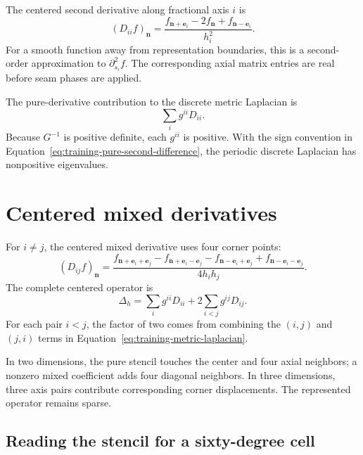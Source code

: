 The centered second derivative along fractional axis $i$ is
\begin{equation}
  (D_{ii}f)_{\mathbf n}
  =
  \frac{
    f_{\mathbf n+\mathbf e_i}
    -2f_{\mathbf n}
    +f_{\mathbf n-\mathbf e_i}}
  {h_i^2}.
  \label{eq:training-pure-second-difference}
\end{equation}
For a smooth function away from representation boundaries, this is a
second-order approximation to $\partial_{s_i}^2f$. The corresponding axial
matrix entries are real before seam phases are applied.

The pure-derivative contribution to the discrete metric Laplacian is
\begin{equation}
  \sum_i g^{ii}D_{ii}.
  \label{eq:training-pure-metric-stencil}
\end{equation}
Because $G^{-1}$ is positive definite, each $g^{ii}$ is positive. With the
sign convention in Equation~\eqref{eq:training-pure-second-difference}, the
periodic discrete Laplacian has nonpositive eigenvalues.

\section{Centered mixed derivatives}

For $i\neq j$, the centered mixed derivative uses four corner points:
\begin{equation}
  (D_{ij}f)_{\mathbf n}
  =
  \frac{
    f_{\mathbf n+\mathbf e_i+\mathbf e_j}
    -f_{\mathbf n+\mathbf e_i-\mathbf e_j}
    -f_{\mathbf n-\mathbf e_i+\mathbf e_j}
    +f_{\mathbf n-\mathbf e_i-\mathbf e_j}}
  {4h_i h_j}.
  \label{eq:training-mixed-second-difference}
\end{equation}
The complete centered operator is
\begin{equation}
  \Delta_h
  =
  \sum_i g^{ii}D_{ii}
  +2\sum_{i<j}g^{ij}D_{ij}.
  \label{eq:training-discrete-metric-laplacian}
\end{equation}
For each pair $i<j$, the factor of two comes from combining the $(i,j)$ and
$(j,i)$ terms in Equation~\eqref{eq:training-metric-laplacian}.

In two dimensions, the pure stencil touches the center and four axial
neighbors; a nonzero mixed coefficient adds four diagonal neighbors. In three
dimensions, three axis pairs contribute corresponding corner displacements.
The represented operator remains sparse.

\subsection{Reading the stencil for a sixty-degree cell}


